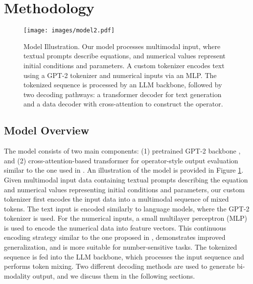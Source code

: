 \documentclass{article}
\begin{document}
\section{Methodology}

\begin{figure}[t]
    \centering
    \texttt{[image: images/model2.pdf]}
    \caption{Model Illustration.  Our model processes multimodal input, where textual prompts describe equations, and numerical values represent initial conditions and parameters. A custom tokenizer encodes text using a GPT-2 tokenizer and numerical inputs via an MLP. The tokenized sequence is processed by an LLM backbone, followed by two decoding pathways: a transformer decoder for text generation and a data decoder with cross-attention to construct the operator.}
    \label{fig:model}
\end{figure}

\subsection{Model Overview}
The model consists of two main components: (1) pretrained GPT-2 backbone \cite{radford2019language}, and (2) cross-attention-based transformer for operator-style output evaluation similar to the one used in \cite{liu2024prose}. An illustration of the model is provided in Figure \ref{fig:model}. Given multimodal input data containing textual prompts describing the equation and numerical values representing initial conditions and parameters, our custom tokenizer first encodes the input data into a multimodal sequence of mixed tokens. The text input is encoded similarly to language models, where the GPT-2 tokenizer is used. For the numerical inputs, a small multilayer perceptron (MLP) is used to encode the numerical data into feature vectors. This continuous encoding strategy similar to the one proposed in \cite{golkar2023xval}, demonstrates improved generalization, and is more suitable for number-sensitive tasks. 
The tokenized sequence is fed into the LLM backbone, which processes the input sequence and performs token mixing. Two different decoding methods are used to generate bi-modality output, and we discuss them in the following sections. 
\end{document}
